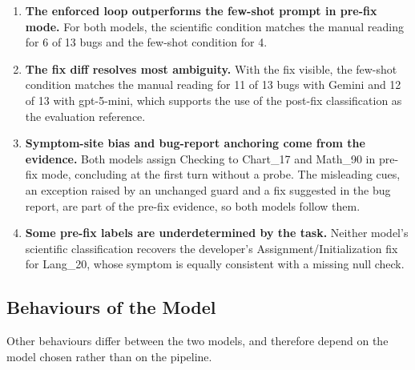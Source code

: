 \documentclass{iutbscthesis}
\begin{document}
\begin{enumerate}
    \item \textbf{The enforced loop outperforms the few-shot prompt in pre-fix mode.} For both models, the scientific condition matches the manual reading for 6 of 13 bugs and the few-shot condition for 4.
    \item \textbf{The fix diff resolves most ambiguity.} With the fix visible, the few-shot condition matches the manual reading for 11 of 13 bugs with Gemini and 12 of 13 with gpt-5-mini, which supports the use of the post-fix classification as the evaluation reference.
    \item \textbf{Symptom-site bias and bug-report anchoring come from the evidence.} Both models assign Checking to Chart\_17 and Math\_90 in pre-fix mode, concluding at the first turn without a probe. The misleading cues, an exception raised by an unchanged guard and a fix suggested in the bug report, are part of the pre-fix evidence, so both models follow them.
    \item \textbf{Some pre-fix labels are underdetermined by the task.} Neither model's scientific classification recovers the developer's Assignment/\allowbreak Initialization fix for Lang\_20, whose symptom is equally consistent with a missing null check.
\end{enumerate}

\subsection{Behaviours of the Model}

Other behaviours differ between the two models, and therefore depend on the model chosen rather than on the pipeline.
\end{document}

